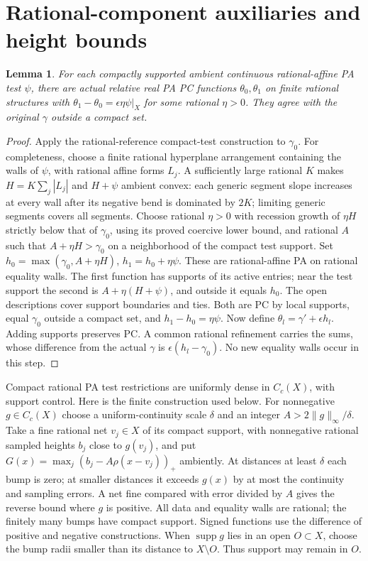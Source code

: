 \documentclass[11pt]{article}
\newtheorem{lemma}[theorem]{Lemma}
\begin{document}
\section{Rational-component auxiliaries and height bounds}
\begin{lemma}\label{dc}
For each compactly supported ambient continuous rational-affine PA
test $\psi$, there are actual relative real PA PC functions
$\theta_0,\theta_1$ on finite rational structures with
$\theta_1-\theta_0=\epsilon\eta\psi|_X$ for some rational $\eta>0$.
They agree with the original $\gamma$ outside a compact set.
\end{lemma}
\begin{proof}
Apply the rational-reference compact-test construction to $\gamma_0$.
For completeness, choose a finite rational hyperplane arrangement
containing the walls of $\psi$, with rational affine forms $L_j$.
A sufficiently large rational $K$ makes $H=K\sum_j|L_j|$ and
$H+\psi$ ambient convex: each generic segment slope increases at
every wall after its negative bend is dominated by $2K$; limiting
generic segments covers all segments. Choose rational $\eta>0$
with recession growth of $\eta H$ strictly below that of $\gamma_0$,
using its proved coercive lower bound, and rational $A$ such that
$A+\eta H>\gamma_0$ on a neighborhood of the compact test support.
Set
$h_0=\max(\gamma_0,A+\eta H)$, $h_1=h_0+\eta\psi$.
These are rational-affine PA on rational equality walls.
The first function has supports of its active entries; near the
test support the second is $A+\eta(H+\psi)$, and outside it equals
$h_0$. The open descriptions cover support boundaries and ties.
Both are PC by local supports, equal $\gamma_0$ outside a compact
set, and $h_1-h_0=\eta\psi$.
Now define $\theta_l=\gamma'+\epsilon h_l$.
Adding supports preserves PC. A common rational refinement carries
the sums, whose difference from the actual $\gamma$ is
$\epsilon(h_l-\gamma_0)$. No new equality walls occur in this step.
\end{proof}

Compact rational PA test restrictions are uniformly dense in $C_c(X)$,
with support control. Here is the finite construction used below.
For nonnegative $g\in C_c(X)$ choose a uniform-continuity scale
$\delta$ and an integer $A>2\|g\|_\infty/\delta$.
Take a fine rational net $v_j\in X$ of its compact support, with
nonnegative rational sampled heights $b_j$ close to $g(v_j)$, and put
$G(x)=\max_j(b_j-A\rho(x-v_j))_+$ ambiently. At distances at least
$\delta$ each bump is zero; at smaller distances it exceeds $g(x)$
by at most the continuity and sampling errors. A net fine compared
with error divided by $A$ gives the reverse bound where $g$ is
positive. All data and equality walls are rational; the finitely
many bumps have compact support. Signed functions use the difference
of positive and negative constructions. When $\operatorname{supp}g$
lies in an open $O\subset X$, choose the bump radii smaller than
its distance to $X\setminus O$. Thus support may remain in $O$.
\end{document}
